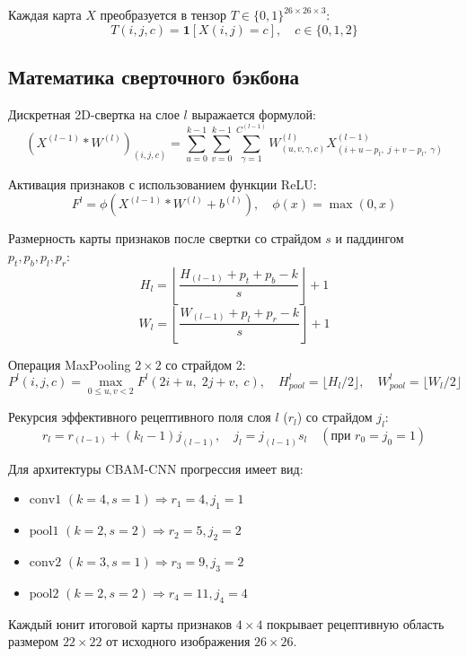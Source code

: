 \documentclass[11pt,a4paper]{article}
\begin{document}
Каждая карта $X$ преобразуется в тензор $T \in \{0,1\}^{26 \times 26 \times 3}$:
\begin{equation}
T(i, j, c) = \mathbf{1}[X(i, j) = c], \quad c \in \{0, 1, 2\}
\end{equation}

\subsection{Математика сверточного бэкбона}
Дискретная 2D-свертка на слое $l$ выражается формулой:
\begin{equation}
\left(X^{(l-1)} * W^{(l)}\right)_{(i,j,c)} = \sum_{u=0}^{k-1} \sum_{v=0}^{k-1} \sum_{\gamma=1}^{C^{(l-1)}} W^{(l)}_{(u,v,\gamma,c)} X^{(l-1)}_{(i+u-p_t, \; j+v-p_l, \; \gamma)}
\end{equation}

Активация признаков с использованием функции ReLU:
\begin{equation}
F^l = \phi\left(X^{(l-1)} * W^{(l)} + b^{(l)}\right), \quad \phi(x) = \max(0, x)
\end{equation}

Размерность карты признаков после свертки со страйдом $s$ и паддингом $p_t, p_b, p_l, p_r$:
\begin{equation}
H_l = \left\lfloor \frac{H_{(l-1)} + p_t + p_b - k}{s} \right\rfloor + 1
\end{equation}
\begin{equation}
W_l = \left\lfloor \frac{W_{(l-1)} + p_l + p_r - k}{s} \right\rfloor + 1
\end{equation}

Операция MaxPooling $2 \times 2$ со страйдом 2:
\begin{equation}
P^l(i, j, c) = \max_{0 \le u, v < 2} F^l(2i+u, \; 2j+v, \; c), \quad H_{pool}^l = \lfloor H_l / 2 \rfloor, \quad W_{pool}^l = \lfloor W_l / 2 \rfloor
\end{equation}

Рекурсия эффективного рецептивного поля слоя $l$ ($r_l$) со страйдом $j_l$:
\begin{equation}
r_l = r_{(l-1)} + (k_l - 1)j_{(l-1)}, \quad j_l = j_{(l-1)}s_l \quad (\text{при } r_0 = j_0 = 1)
\end{equation}

Для архитектуры CBAM-CNN прогрессия имеет вид:
\begin{itemize}
    \item $\text{conv1 } (k=4, s=1) \Rightarrow r_1=4, j_1=1$
    \item $\text{pool1 } (k=2, s=2) \Rightarrow r_2=5, j_2=2$
    \item $\text{conv2 } (k=3, s=1) \Rightarrow r_3=9, j_3=2$
    \item $\text{pool2 } (k=2, s=2) \Rightarrow r_4=11, j_4=4$
\end{itemize}
Каждый юнит итоговой карты признаков $4 \times 4$ покрывает рецептивную область размером $22 \times 22$ от исходного изображения $26 \times 26$.
\end{document}
